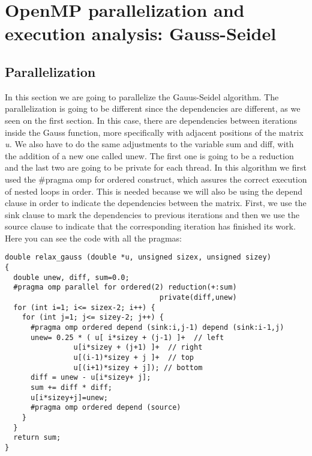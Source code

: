 \section{OpenMP parallelization and execution analysis: Gauss-Seidel}

\subsection{Parallelization}
\justify
In this section we are going to parallelize the Gauus-Seidel algorithm. The parallelization is going to be different since the dependencies are different, as we seen on the first section. In this case, there are dependencies between iterations inside the Gauss function, more specifically with adjacent positions of the matrix \textit{u.}
\justify
We also have to do the same adjustments to the variable sum and diff, with the addition of a new one called unew. The first one is going to be a reduction and the last two are going to be private for each thread.
\justify
In this algorithm we first used the \#pragma omp for ordered construct, which assures the correct execution of nested loops in order. This is needed because we will also be using the depend clause in order to indicate the dependencies between the matrix. First, we use the sink clause to mark the dependencies to previous iterations and then we use the source clause to indicate that the corresponding iteration has finished its work.
\justify
Here you can see the code with all the pragmas:

\begin{lstlisting}
double relax_gauss (double *u, unsigned sizex, unsigned sizey)
{
  double unew, diff, sum=0.0;
  #pragma omp parallel for ordered(2) reduction(+:sum) 
                                    private(diff,unew)
  for (int i=1; i<= sizex-2; i++) {
    for (int j=1; j<= sizey-2; j++) {
      #pragma omp ordered depend (sink:i,j-1) depend (sink:i-1,j)
      unew= 0.25 * ( u[ i*sizey	+ (j-1) ]+  // left
				u[i*sizey + (j+1) ]+  // right
				u[(i-1)*sizey + j ]+  // top
				u[(i+1)*sizey + j]); // bottom
      diff = unew - u[i*sizey+ j];
      sum += diff * diff; 
      u[i*sizey+j]=unew;
      #pragma omp ordered depend (source)
	}
  }
  return sum;
}
\end{lstlisting}

